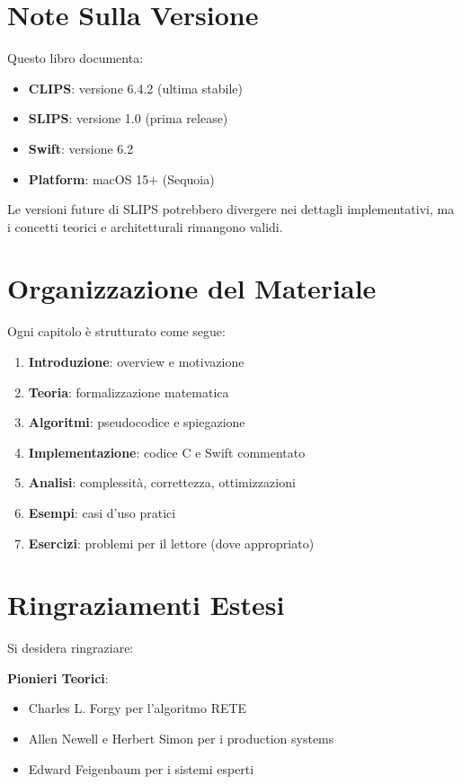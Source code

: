 \section{Note Sulla Versione}

Questo libro documenta:

\begin{itemize}
\item \textbf{CLIPS}: versione 6.4.2 (ultima stabile)
\item \textbf{SLIPS}: versione 1.0 (prima release)
\item \textbf{Swift}: versione 6.2
\item \textbf{Platform}: macOS 15+ (Sequoia)
\end{itemize}

Le versioni future di SLIPS potrebbero divergere nei dettagli implementativi, ma i concetti teorici e architetturali rimangono validi.

\section{Organizzazione del Materiale}

Ogni capitolo è strutturato come segue:

\begin{enumerate}
\item \textbf{Introduzione}: overview e motivazione
\item \textbf{Teoria}: formalizzazione matematica
\item \textbf{Algoritmi}: pseudocodice e spiegazione
\item \textbf{Implementazione}: codice C e Swift commentato
\item \textbf{Analisi}: complessità, correttezza, ottimizzazioni
\item \textbf{Esempi}: casi d'uso pratici
\item \textbf{Esercizi}: problemi per il lettore (dove appropriato)
\end{enumerate}

\section{Ringraziamenti Estesi}

Si desidera ringraziare:

\textbf{Pionieri Teorici}:
\begin{itemize}
\item Charles L. Forgy per l'algoritmo RETE
\item Allen Newell e Herbert Simon per i production systems
\item Edward Feigenbaum per i sistemi esperti
\end{itemize}

